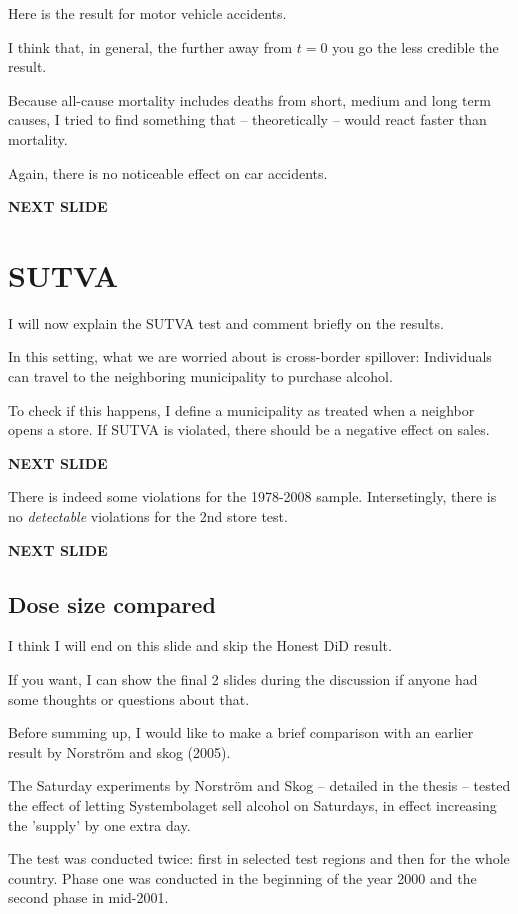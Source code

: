 \documentclass[12pt]{article}
\begin{document}
Here is the result for motor vehicle accidents.

I think that, in general, the further away from $t = 0$ you go the less credible the result. 

Because all-cause mortality includes deaths from short, medium and long term causes, I tried to find something that -- theoretically -- would react faster than mortality. 

Again, there is no noticeable effect on car accidents.

\textbf{NEXT SLIDE}

\section{SUTVA}

I will now explain the SUTVA test and comment briefly on the results.

In this setting, what we are worried about is cross-border spillover: Individuals can travel to the neighboring municipality to purchase alcohol.

To check if this happens, I define a municipality as treated when a neighbor opens a store. If SUTVA is violated, there should be a negative effect on sales.

\textbf{NEXT SLIDE}

There is indeed some violations for the 1978-2008 sample. Intersetingly, there is no \emph{detectable} violations for the 2nd store test. 

\textbf{NEXT SLIDE}

\subsection{Dose size compared}

I think I will end on this slide and skip the Honest DiD result. 

If you want, I can show the final 2 slides during the discussion if anyone had some thoughts or questions about that.

Before summing up, I would like to make a brief comparison with an earlier result by Norström and skog (2005). 

The Saturday experiments by Norström and Skog -- detailed in the thesis --  tested the effect of letting Systembolaget sell alcohol on Saturdays, in effect increasing the 'supply' by one extra day. 

The test was conducted twice: first in selected test regions and then for the whole country. Phase one was conducted in the beginning of the year 2000 and the second phase in mid-2001. 
\end{document}
